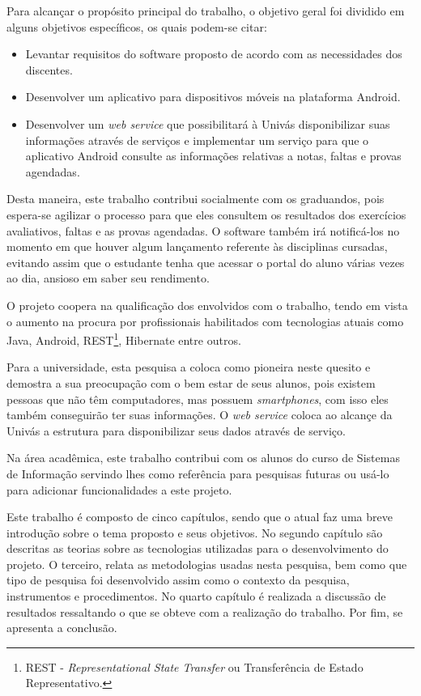 	\par Para alcançar o propósito principal do trabalho, o objetivo geral foi
dividido em alguns objetivos específicos, os quais podem-se citar:
	
	\begin{itemize}
	  
	  \item Levantar requisitos do software proposto de acordo com as
	  necessidades dos discentes.
	  
	  \item Desenvolver um aplicativo para dispositivos móveis na plataforma
	  Android.
	  
	  \item Desenvolver um \textit{web service} que possibilitará à Univás
	  disponibilizar suas informações através de serviços e implementar um serviço
	  para que o aplicativo Android consulte as informações  relativas a notas,
	  faltas e provas agendadas.
	
	\end{itemize}
	
	\par Desta maneira, este trabalho contribui socialmente com os
graduandos, pois espera-se agilizar o processo para que eles consultem os
resultados dos exercícios avaliativos, faltas e as provas agendadas. O software
também irá notificá-los no momento em que houver algum lançamento referente às
disciplinas cursadas, evitando assim que o estudante tenha que acessar o portal
do aluno várias vezes ao dia, ansioso em saber seu rendimento.

	\par O projeto coopera na qualificação dos envolvidos com o trabalho, tendo em
vista o aumento na procura por profissionais habilitados com tecnologias atuais
como Java, Android, REST\footnote{REST - \textit{Representational State
Transfer} ou Transferência de Estado Representativo.}, Hibernate entre outros.

	\par Para a universidade, esta pesquisa a coloca como pioneira neste quesito e
demostra a sua preocupação com o bem estar de seus alunos, pois existem pessoas
que não têm computadores, mas possuem \textit{smartphones}, com isso eles
também conseguirão ter suas informações. O \textit{web service} coloca ao
alcançe da Univás a estrutura para disponibilizar seus dados através de
serviço.

	\par Na área acadêmica, este trabalho contribui com os alunos do curso de
	Sistemas de Informação servindo lhes como referência para pesquisas futuras ou usá-lo
para adicionar funcionalidades a este projeto.

	\par Este trabalho é composto de cinco capítulos, sendo que o atual faz uma
breve introdução sobre o tema proposto e seus objetivos. No segundo capítulo são
descritas as teorias sobre as tecnologias utilizadas para o desenvolvimento do
projeto. O terceiro, relata as metodologias usadas nesta pesquisa, bem como que
tipo de pesquisa foi desenvolvido assim como o contexto da pesquisa,
instrumentos e procedimentos. No quarto capítulo é realizada a discussão de
resultados ressaltando o que se obteve com a realização do trabalho. Por fim,
se apresenta a conclusão.
